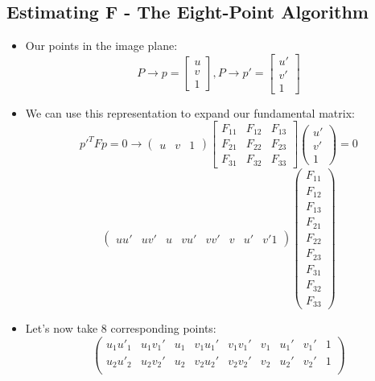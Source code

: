 \subsection{Estimating F - The Eight-Point Algorithm}
\begin{itemize}
	\item Our points in the image plane:
	$$P\to p=\begin{bmatrix}
		u \\ v \\ 1
	\end{bmatrix}, P\to p'=\begin{bmatrix}
		u' \\ v' \\ 1
	\end{bmatrix}$$
	\item We can use this representation to expand our fundamental matrix:
	$$p'^T Fp=0\to \begin{pmatrix}
		u & v & 1
	\end{pmatrix}\begin{bmatrix}
		F_{11} & F_{12} & F_{13} \\
		F_{21} & F_{22} & F_{23} \\
		F_{31} & F_{32} & F_{33} 
	\end{bmatrix}\begin{pmatrix}
		u' \\ v'\\ 1
	\end{pmatrix} = 0$$
	$$\begin{pmatrix}
		uu' & uv' & u & vu' & vv' & v & u' & v' 1
	\end{pmatrix}\begin{pmatrix}
		F_{11} \\ F_{12} \\ F_{13} \\ F_{21} \\F_{22} \\ F_{23} \\ F_{31} \\ F_{32} \\ F_{33}
	\end{pmatrix}$$
	\item Let's now take 8 corresponding points:
	$$\begin{pmatrix}
		u_1u'_1 & u_1 v_1' & u_1 & v_1 u_1' & v_1 v_1' & v_1 & u_1' & v_1' & 1 \\
		u_2u'_2 & u_2 v_2' & u_2 & v_2 u_2' & v_2 v_2' & v_2 & u_2' & v_2' & 1 \\

\end{pmatrix}$$
\end{itemize}
